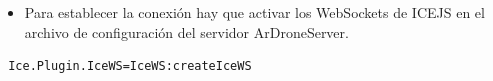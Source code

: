 \documentclass[notes,slidesec,a4]{seminar}
\begin{document}

\begin{hslide}
\begin{itemize}
\item Para establecer la conexión hay que activar los WebSockets de ICEJS en el archivo de configuración del servidor ArDroneServer.
\end{itemize}
\lstset{}
\begin{lstlisting}
 Ice.Plugin.IceWS=IceWS:createIceWS
\end{lstlisting}
\end{hslide}







\end{document}
